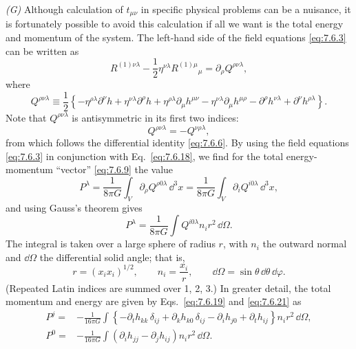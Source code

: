 \medskip
\noindent\textit{(G)} Although calculation of \(t_{\mu\nu}\) in specific
physical problems can be a nuisance, it is fortunately possible to avoid
this calculation if all we want is the total energy and momentum of the
system. The left-hand side of the field equations \eqref{eq:7.6.3} can be
written as
\begin{equation}
  R^{(1)\nu\lambda}
  -\frac12\eta^{\nu\lambda}R^{(1)\mu}{}_\mu
  =
  \partial_\rho Q^{\rho\nu\lambda},
  \tag{7.6.18}\label{eq:7.6.18}
\end{equation}
where
\begin{equation}
  Q^{\rho\nu\lambda}
  \equiv
  \frac12\left\{
    -\eta^{\rho\lambda}\partial^\nu h
    +\eta^{\nu\lambda}\partial^\rho h
    +\eta^{\rho\lambda}\partial_\mu h^{\mu\nu}
    -\eta^{\nu\lambda}\partial_\mu h^{\mu\rho}
    -\partial^\rho h^{\nu\lambda}
    +\partial^\nu h^{\rho\lambda}
  \right\}.
  \tag{7.6.19}\label{eq:7.6.19}
\end{equation}
Note that \(Q^{\rho\nu\lambda}\) is antisymmetric in its first two indices:
\begin{equation}
  Q^{\rho\nu\lambda}=-Q^{\nu\rho\lambda},
  \tag{7.6.20}\label{eq:7.6.20}
\end{equation}
from which follows the differential identity \eqref{eq:7.6.6}. By using
the field equations \eqref{eq:7.6.3} in conjunction with
Eq.~\eqref{eq:7.6.18}, we find for the total energy-momentum ``vector''
\eqref{eq:7.6.9} the value
\[
  P^\lambda
  =
  \frac{1}{8\pi G}\int_V\partial_\rho Q^{\rho0\lambda}\,\dd^3x
  =
  \frac{1}{8\pi G}\int_V\partial_i Q^{i0\lambda}\,\dd^3x,
\]
and using Gauss's theorem gives
\begin{equation}
  P^\lambda
  =
  \frac{1}{8\pi G}
  \int Q^{i0\lambda}n_i r^2\,\dd\Omega .
  \tag{7.6.21}\label{eq:7.6.21}
\end{equation}
The integral is taken over a large sphere of radius \(r\), with \(n_i\) the
outward normal and \(\dd\Omega\) the differential solid angle; that is,
\[
  r=(x_ix_i)^{1/2},
  \qquad
  n_i=\frac{x_i}{r},
  \qquad
  \dd\Omega=\sin\theta\,\dd\theta\,\dd\varphi .
\]
(Repeated Latin indices are summed over 1, 2, 3.) In greater detail, the
total momentum and energy are given by Eqs.~\eqref{eq:7.6.19} and
\eqref{eq:7.6.21} as
\begin{align}
  P^j
  ={}&
  -\frac{1}{16\pi G}
  \int\left\{
    -\partial_t h_{kk}\,\delta_{ij}
    +\partial_k h_{k0}\,\delta_{ij}
    -\partial_i h_{j0}
    +\partial_t h_{ij}
  \right\}n_i r^2\,\dd\Omega ,
  \tag{7.6.22}\label{eq:7.6.22}\\
  P^0
  ={}&
  -\frac{1}{16\pi G}
  \int\left(
    \partial_i h_{jj}
    -\partial_j h_{ij}
  \right)n_i r^2\,\dd\Omega .
  \tag{7.6.23}\label{eq:7.6.23}
\end{align}

